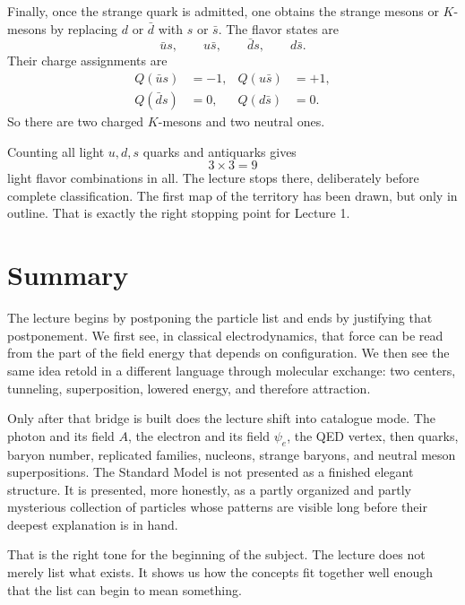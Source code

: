 Finally, once the strange quark is admitted, one obtains the strange mesons or \(K\)-mesons by replacing \(d\) or \(\bar d\) with \(s\) or \(\bar s\). The flavor states are
\begin{equation}
\bar u s,\qquad u\bar s,\qquad \bar d s,\qquad d\bar s.
\end{equation}
Their charge assignments are
\begin{align}
Q(\bar u s) &=-1,
&
Q(u\bar s) &=+1,
\\
Q(\bar d s) &=0,
&
Q(d\bar s) &=0.
\end{align}
So there are two charged \(K\)-mesons and two neutral ones.

Counting all light \(u,d,s\) quarks and antiquarks gives
\begin{equation}
3\times 3 = 9
\end{equation}
light flavor combinations in all. The lecture stops there, deliberately before complete classification. The first map of the territory has been drawn, but only in outline. That is exactly the right stopping point for Lecture 1.

\section{Summary}

The lecture begins by postponing the particle list and ends by justifying that postponement. We first see, in classical electrodynamics, that force can be read from the part of the field energy that depends on configuration. We then see the same idea retold in a different language through molecular exchange: two centers, tunneling, superposition, lowered energy, and therefore attraction.

Only after that bridge is built does the lecture shift into catalogue mode. The photon and its field \(A\), the electron and its field \(\psi_e\), the QED vertex, then quarks, baryon number, replicated families, nucleons, strange baryons, and neutral meson superpositions. The Standard Model is not presented as a finished elegant structure. It is presented, more honestly, as a partly organized and partly mysterious collection of particles whose patterns are visible long before their deepest explanation is in hand.

That is the right tone for the beginning of the subject. The lecture does not merely list what exists. It shows us how the concepts fit together well enough that the list can begin to mean something.

